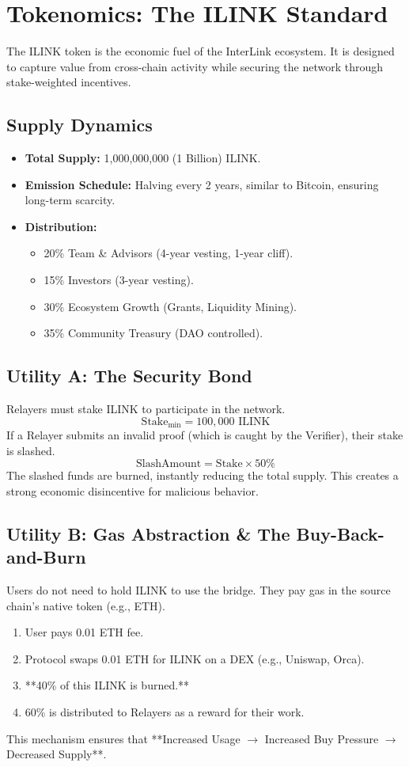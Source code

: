 \documentclass[11pt,a4paper]{article}
\begin{document}
\section{Tokenomics: The ILINK Standard}
\label{sec:tokenomics}

The ILINK token is the economic fuel of the InterLink ecosystem. It is designed to capture value from cross-chain activity while securing the network through stake-weighted incentives.

\subsection{Supply Dynamics}
\begin{itemize}
    \item \textbf{Total Supply:} 1,000,000,000 (1 Billion) ILINK.
    \item \textbf{Emission Schedule:} Halving every 2 years, similar to Bitcoin, ensuring long-term scarcity.
    \item \textbf{Distribution:}
        \begin{itemize}
            \item 20\% Team \& Advisors (4-year vesting, 1-year cliff).
            \item 15\% Investors (3-year vesting).
            \item 30\% Ecosystem Growth (Grants, Liquidity Mining).
            \item 35\% Community Treasury (DAO controlled).
        \end{itemize}
\end{itemize}

\subsection{Utility A: The Security Bond}
Relayers must stake ILINK to participate in the network.
$$ \text{Stake}_{\text{min}} = 100,000 \text{ ILINK} $$
If a Relayer submits an invalid proof (which is caught by the Verifier), their stake is slashed.
$$ \text{SlashAmount} = \text{Stake} \times 50\% $$
The slashed funds are burned, instantly reducing the total supply. This creates a strong economic disincentive for malicious behavior.

\subsection{Utility B: Gas Abstraction \& The Buy-Back-and-Burn}
Users do not need to hold ILINK to use the bridge. They pay gas in the source chain's native token (e.g., ETH).
\begin{enumerate}
    \item User pays 0.01 ETH fee.
    \item Protocol swaps 0.01 ETH for ILINK on a DEX (e.g., Uniswap, Orca).
    \item **40\% of this ILINK is burned.**
    \item 60\% is distributed to Relayers as a reward for their work.
\end{enumerate}
This mechanism ensures that **Increased Usage $\rightarrow$ Increased Buy Pressure $\rightarrow$ Decreased Supply**.
\end{document}
